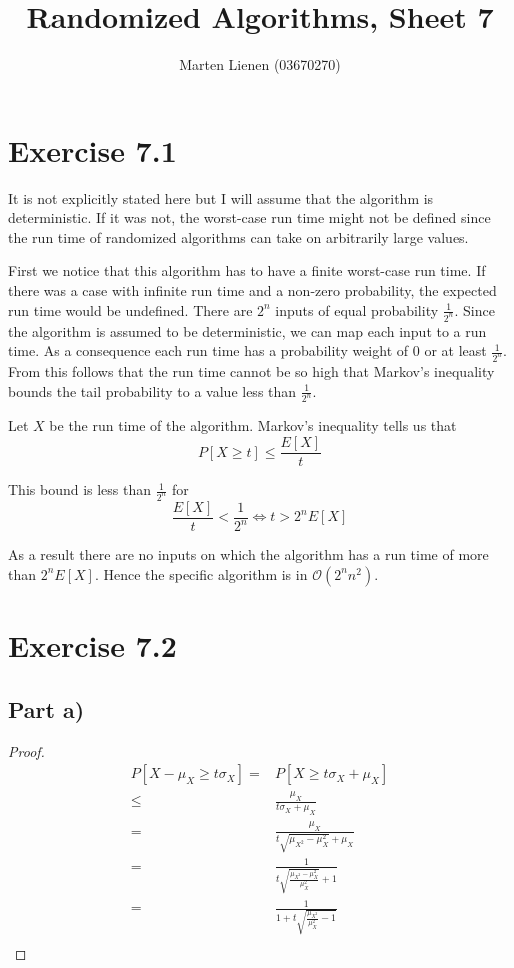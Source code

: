 \documentclass[10pt,a4paper]{article}
\title{Randomized Algorithms, Sheet 7}
\author{Marten Lienen (03670270)}
\begin{document}
\maketitle

\section*{Exercise 7.1}

It is not explicitly stated here but I will assume that the algorithm is deterministic.
If it was not, the worst-case run time might not be defined since the run time of randomized algorithms can take on arbitrarily large values.

First we notice that this algorithm has to have a finite worst-case run time.
If there was a case with infinite run time and a non-zero probability, the expected run time would be undefined.
There are $2^{n}$ inputs of equal probability $\frac{1}{2^{n}}$.
Since the algorithm is assumed to be deterministic, we can map each input to a run time.
As a consequence each run time has a probability weight of $0$ or at least $\frac{1}{2^{n}}$.
From this follows that the run time cannot be so high that Markov's inequality bounds the tail probability to a value less than $\frac{1}{2^{n}}$.

Let $X$ be the run time of the algorithm.
Markov's inequality tells us that
\begin{equation*}
  P[X \ge t] \le \frac{E[X]}{t}
\end{equation*}

This bound is less than $\frac{1}{2^{n}}$ for
\begin{equation*}
  \frac{E[X]}{t} < \frac{1}{2^{n}} \Leftrightarrow t > 2^{n}E[X]
\end{equation*}

As a result there are no inputs on which the algorithm has a run time of more than $2^{n}E[X]$.
Hence the specific algorithm is in $\mathcal{O}(2^{n}n^{2})$.

\section*{Exercise 7.2}

\subsection*{Part a)}

\begin{proof}
  \begin{align*}
    P[X - \mu_{X} \ge t\sigma_{X}] = & P[X \ge t\sigma_{X} + \mu_{X}]\\
    \le & \frac{\mu_{X}}{t\sigma_{X} + \mu_{X}}\\
    = & \frac{\mu_{X}}{t\sqrt{\mu_{X^{2}} - \mu_{X}^{2}} + \mu_{X}}\\
    = & \frac{1}{t\sqrt{\frac{\mu_{X^{2}} - \mu_{X}^{2}}{\mu_{X}^{2}}} + 1}\\
    = & \frac{1}{1 + t\sqrt{\frac{\mu_{X^{2}}}{\mu_{X}^{2}} - 1}}\\
  \end{align*}
\end{proof}
\end{document}
